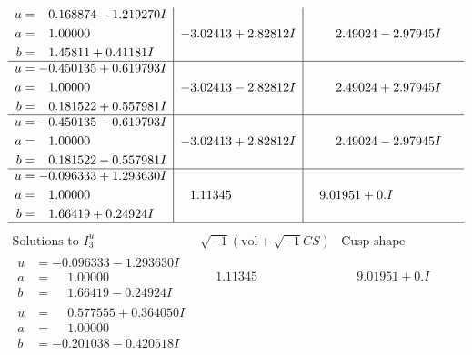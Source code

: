 \documentclass[1p]{elsarticle_modified}
\theoremstyle{definition}
\newcommand{\I}{\sqrt{-1}}
\begin{document}
$$\begin{array}{c|c|c}
\begin{aligned}
u &= \phantom{-}0.168874 - 1.219270 I \\
a &= \phantom{-}1.00000\phantom{ +0.000000I} \\
b &= \phantom{-}1.45811 + 0.41181 I\end{aligned}
 & -3.02413 + 2.82812 I & \phantom{-}2.49024 - 2.97945 I \\ \hline\begin{aligned}
u &= -0.450135 + 0.619793 I \\
a &= \phantom{-}1.00000\phantom{ +0.000000I} \\
b &= \phantom{-}0.181522 + 0.557981 I\end{aligned}
 & -3.02413 - 2.82812 I & \phantom{-}2.49024 + 2.97945 I \\ \hline\begin{aligned}
u &= -0.450135 - 0.619793 I \\
a &= \phantom{-}1.00000\phantom{ +0.000000I} \\
b &= \phantom{-}0.181522 - 0.557981 I\end{aligned}
 & -3.02413 + 2.82812 I & \phantom{-}2.49024 - 2.97945 I \\ \hline\begin{aligned}
u &= -0.096333 + 1.293630 I \\
a &= \phantom{-}1.00000\phantom{ +0.000000I} \\
b &= \phantom{-}1.66419 + 0.24924 I\end{aligned}
 & \phantom{-}1.11345\phantom{ +0.000000I} & \phantom{-}9.01951 + 0. I\phantom{ +0.000000I}\\
 \hline 
 \end{array}$$\newpage$$\begin{array}{c|c|c}  
\text{Solutions to }I^u_{3}& \I (\text{vol} + \sqrt{-1}CS) & \text{Cusp shape}\\
 \hline 
\begin{aligned}
u &= -0.096333 - 1.293630 I \\
a &= \phantom{-}1.00000\phantom{ +0.000000I} \\
b &= \phantom{-}1.66419 - 0.24924 I\end{aligned}
 & \phantom{-}1.11345\phantom{ +0.000000I} & \phantom{-}9.01951 + 0. I\phantom{ +0.000000I} \\ \hline\begin{aligned}
u &= \phantom{-}0.577555 + 0.364050 I \\
a &= \phantom{-}1.00000\phantom{ +0.000000I} \\
b &= -0.201038 - 0.420518 I\end{aligned}

\end{array}$$
\end{document}
